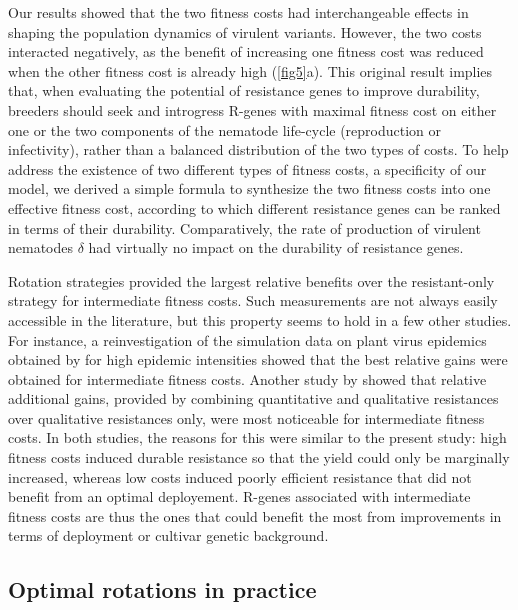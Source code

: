 {{{{Our results showed that the two fitness costs had interchangeable
effects in shaping the population dynamics of virulent
variants. However, the two costs interacted negatively, as the benefit
of increasing one fitness cost was reduced when the other fitness cost
is already high (\autoref{fig5}a). This original result
implies that, when evaluating the potential of resistance
genes to improve durability, breeders should seek and introgress
R-genes with maximal fitness cost on either one or the two components
of the nematode life-cycle (reproduction or infectivity), rather than
a balanced distribution of the two types of costs. To help address the
existence of two different types of fitness costs, a specificity of
our model, we derived a simple formula to synthesize the two fitness
costs into one effective fitness cost, according to which different
resistance genes can be ranked in terms of their
durability. Comparatively, the rate of production of virulent
nematodes $\delta$ had virtually no impact on the durability of
resistance genes.

Rotation strategies provided the largest relative
benefits over the resistant-only strategy for intermediate fitness
costs. Such measurements are not always easily accessible in the literature,
but this property seems to hold in a few other studies. For instance,
a reinvestigation of the simulation data on plant virus epidemics
obtained by \citet{Fabre2012} for high epidemic intensities showed
that the best relative gains were obtained for intermediate fitness
costs. Another study by \citet{Rousseau2019} showed that relative
additional gains, provided by combining quantitative and qualitative
resistances over qualitative resistances only, were most noticeable
for intermediate fitness costs. In both studies, the reasons for this
were similar to the present study: high fitness costs induced durable
resistance so that the yield could only be marginally increased, whereas
low costs induced poorly efficient resistance that did not benefit
from an optimal deployement. R-genes associated with intermediate
fitness costs are thus the ones that could benefit the most from improvements
in terms of deployment or cultivar genetic background.

\subsection{Optimal rotations in practice} \label{sec:discussion-OptRot-in-practice}
 
}}}}
